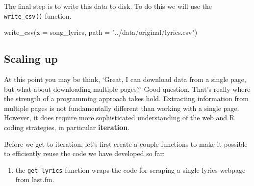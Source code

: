 \documentclass[
  letterpaper,
]{latex/krantz}
\newenvironment{Shaded}{\begin{snugshade}}{\end{snugshade}}
\newcommand{\AttributeTok}[1]{\textcolor[rgb]{0.00,0.00,0.00}{#1}}
\newcommand{\FunctionTok}[1]{\textcolor[rgb]{0.00,0.00,0.00}{#1}}
\newcommand{\NormalTok}[1]{\textcolor[rgb]{0.00,0.00,0.00}{#1}}
\newcommand{\StringTok}[1]{\textcolor[rgb]{0.00,0.00,0.00}{#1}}
\providecommand{\tightlist}{%
  \setlength{\itemsep}{0pt}\setlength{\parskip}{0pt}}\usepackage{longtable,booktabs,array}
\begin{document}
The final step is to write this data to disk. To do this we will use the
\texttt{write\_csv()} function.

\begin{Shaded}
\begin{Highlighting}[]
\FunctionTok{write\_csv}\NormalTok{(}\AttributeTok{x =}\NormalTok{ song\_lyrics, }\AttributeTok{path =} \StringTok{"../data/original/lyrics.csv"}\NormalTok{)}
\end{Highlighting}
\end{Shaded}

\hypertarget{scaling-up}{%
\subsection{Scaling up}\label{scaling-up}}

At this point you may be think, `Great, I can download data from a
single page, but what about downloading multiple pages?' Good question.
That's really where the strength of a programming approach takes hold.
Extracting information from multiple pages is not fundamentally
different than working with a single page. However, it does require more
sophisticated understanding of the web and R coding strategies, in
particular \textbf{iteration}.

Before we get to iteration, let's first create a couple functions to
make it possible to efficiently reuse the code we have developed so far:

\begin{enumerate}
\def\labelenumi{\arabic{enumi}.}
\tightlist
\item
  the \texttt{get\_lyrics} function wraps the code for scraping a single
  lyrics webpage from last.fm.
\end{enumerate}
\end{document}
